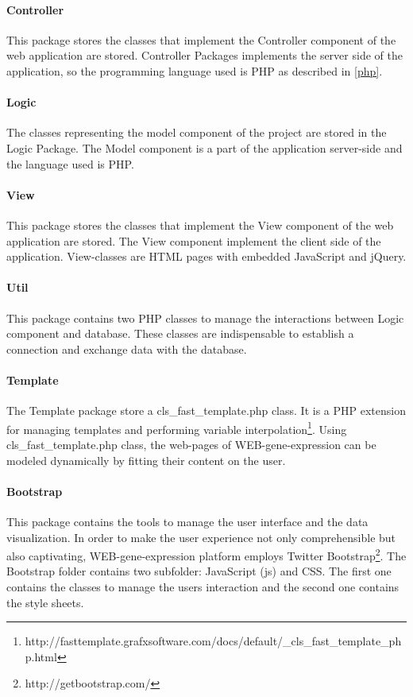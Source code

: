 \documentclass[a4paper]{report}
\begin{document}
\paragraph{Controller} This package stores the classes that implement the Controller component of the web application  are stored. Controller Packages implements the server side of the application, so the programming language used is PHP as described in \ref{php}.

\paragraph{Logic} The classes representing the model component of the project are stored in the Logic Package. The Model component is a part of the application server-side and the language used is PHP.

\paragraph{View} This package stores the classes that implement the View component of the web application  are stored. The View component implement the client side of the application. View-classes are HTML pages with embedded JavaScript and jQuery.

\paragraph{Util} This package contains two PHP classes to manage the interactions between Logic component and database. These classes are indispensable to establish a connection and exchange data with the database.

\paragraph{Template} The Template package store a cls\_fast\_template.php class. It is a PHP extension for managing templates and performing variable interpolation\footnote{http://fasttemplate.grafxsoftware.com/docs/default/\_cls\_fast\_template\_php.html}.
Using cls\_fast\_template.php class, the web-pages of WEB-gene-expression can be modeled dynamically by fitting their content on the user.

\paragraph{Bootstrap} This package contains the tools to manage the user interface and the data visualization. In order to make the user experience not only comprehensible but also captivating, WEB-gene-expression platform employs Twitter Bootstrap\footnote{http://getbootstrap.com/}. The Bootstrap folder contains two subfolder: JavaScript (js) and CSS. The first one contains the classes to manage the users interaction and the second one contains the style sheets. 
\end{document}
